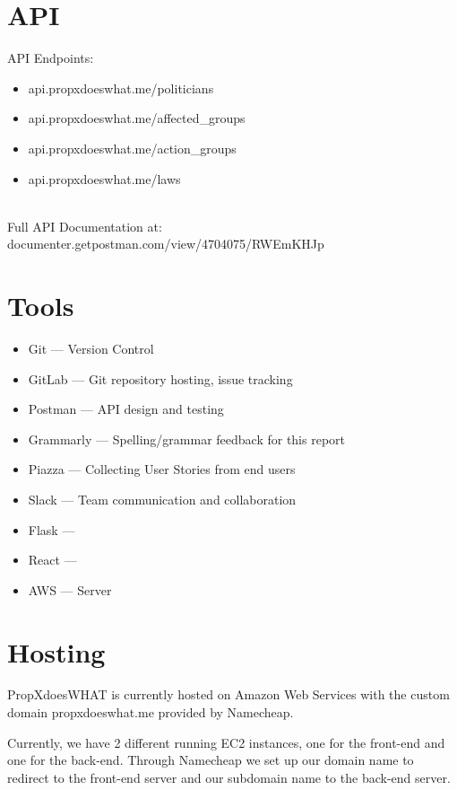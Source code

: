 \documentclass[12pt]{article}
\begin{document}
\section{API}

API Endpoints: \\

\begin{itemize}
	\item api.propxdoeswhat.me/politicians
	\item api.propxdoeswhat.me/affected\_groups
	\item api.propxdoeswhat.me/action\_groups
	\item api.propxdoeswhat.me/laws
\end{itemize}

~\\
Full API Documentation at: documenter.getpostman.com/view/4704075/RWEmKHJp

\section{Tools}

\begin{itemize}
	\item Git		--- Version Control
	\item GitLab	--- Git repository hosting, issue tracking
	\item Postman	--- API design and testing %
	\item Grammarly	--- Spelling/grammar feedback for this report
	\item Piazza	--- Collecting User Stories from end users
	\item Slack		--- Team communication and collaboration
	\item Flask     --- 
	\item React     ---
	\item AWS       --- Server
\end{itemize}

\section{Hosting}

PropXdoesWHAT is currently hosted on Amazon Web Services with the custom domain propxdoeswhat.me provided by Namecheap.

Currently, we have 2 different running EC2 instances, one for the front-end and one for the back-end. Through Namecheap we set up our domain name to redirect to the front-end server and our subdomain name to the back-end server.
\end{document}

